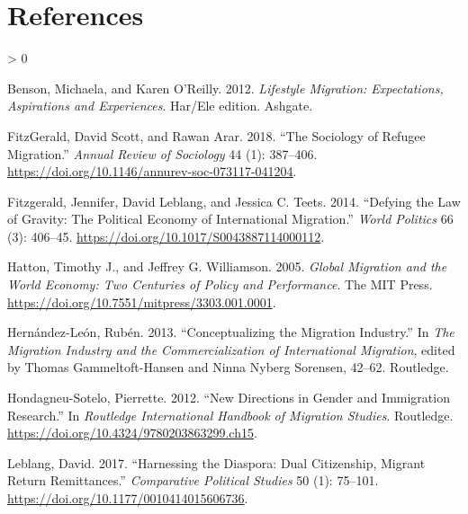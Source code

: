 \documentclass[
  11pt,
]{article}
\newlength{\cslhangindent}
\newenvironment{CSLReferences}[2] %
 {%
  \setlength{\parindent}{0pt}
  \ifodd #1 \everypar{\setlength{\hangindent}{\cslhangindent}}\ignorespaces\fi
  \ifnum #2 > 0
  \setlength{\parskip}{#2\baselineskip}
  \fi
 }%
 {}
\begin{document}
\hypertarget{references}{%
\section{References}\label{references}}

\setlength{\parindent}{-0.2in}
\setlength{\leftskip}{0.2in}
\setlength{\parskip}{8pt}

\noindent

\hypertarget{refs}{}
\begin{CSLReferences}{1}{0}
\leavevmode\hypertarget{ref-benson_2012}{}%
Benson, Michaela, and Karen O'Reilly. 2012. \emph{Lifestyle {Migration}: {Expectations}, {Aspirations} and {Experiences}}. Har/Ele edition. Ashgate.

\leavevmode\hypertarget{ref-fitzgerald_2018}{}%
FitzGerald, David Scott, and Rawan Arar. 2018. {``The {Sociology} of {Refugee} {Migration}.''} \emph{Annual Review of Sociology} 44 (1): 387--406. \url{https://doi.org/10.1146/annurev-soc-073117-041204}.

\leavevmode\hypertarget{ref-fitzgerald_2014}{}%
Fitzgerald, Jennifer, David Leblang, and Jessica C. Teets. 2014. {``Defying the {Law} of {Gravity}: {The} {Political} {Economy} of {International} {Migration}.''} \emph{World Politics} 66 (3): 406--45. \url{https://doi.org/10.1017/S0043887114000112}.

\leavevmode\hypertarget{ref-hatton_2005a}{}%
Hatton, Timothy J., and Jeffrey G. Williamson. 2005. \emph{Global {Migration} and the {World} {Economy}: {Two} {Centuries} of {Policy} and {Performance}}. The MIT Press. \url{https://doi.org/10.7551/mitpress/3303.001.0001}.

\leavevmode\hypertarget{ref-hernandez-leon_2013}{}%
Hernández-León, Rubén. 2013. {``Conceptualizing the Migration Industry.''} In \emph{The Migration Industry and the Commercialization of International Migration}, edited by Thomas Gammeltoft-Hansen and Ninna Nyberg Sorensen, 42--62. Routledge.

\leavevmode\hypertarget{ref-hondagneu-sotelo_2012}{}%
Hondagneu-Sotelo, Pierrette. 2012. {``New Directions in Gender and Immigration Research.''} In \emph{Routledge {International} {Handbook} of {Migration} {Studies}}. Routledge. \url{https://doi.org/10.4324/9780203863299.ch15}.

\leavevmode\hypertarget{ref-leblang_2017}{}%
Leblang, David. 2017. {``Harnessing the {Diaspora}: {Dual} {Citizenship}, {Migrant} {Return} {Remittances}.''} \emph{Comparative Political Studies} 50 (1): 75--101. \url{https://doi.org/10.1177/0010414015606736}.


\end{CSLReferences}
\end{document}
